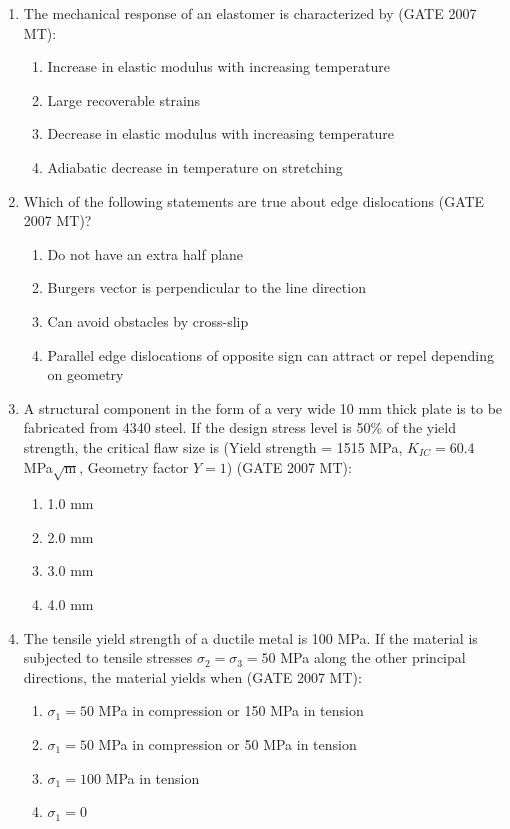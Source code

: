 \documentclass[12pt]{article}
\begin{document}
\begin{enumerate}
\item The mechanical response of an elastomer is characterized by (GATE 2007 MT):  
  \begin{enumerate}[label=(\Alph*)]
    \item Increase in elastic modulus with increasing temperature
    \item Large recoverable strains
    \item Decrease in elastic modulus with increasing temperature
    \item Adiabatic decrease in temperature on stretching
  \end{enumerate}

\item Which of the following statements are true about edge dislocations (GATE 2007 MT)?  
  \begin{enumerate}[label=(\Alph*)]
    \item Do not have an extra half plane
    \item Burgers vector is perpendicular to the line direction
    \item Can avoid obstacles by cross-slip
    \item Parallel edge dislocations of opposite sign can attract or repel depending on geometry
  \end{enumerate}

\item A structural component in the form of a very wide 10 mm thick plate is to be fabricated from 4340 steel. If the design stress level is 50\% of the yield strength, the critical flaw size is (Yield strength = 1515 MPa, $K_{IC}=60.4$ MPa$\sqrt{\text{m}}$, Geometry factor $Y=1$) (GATE 2007 MT):  
  \begin{enumerate}[label=(\Alph*)]
    \item 1.0 mm
    \item 2.0 mm
    \item 3.0 mm
    \item 4.0 mm
  \end{enumerate}

\item The tensile yield strength of a ductile metal is 100 MPa. If the material is subjected to tensile stresses $\sigma_2 = \sigma_3 = 50$ MPa along the other principal directions, the material yields when (GATE 2007 MT):  
  \begin{enumerate}[label=(\Alph*)]
    \item $\sigma_1 = 50$ MPa in compression or 150 MPa in tension
    \item $\sigma_1 = 50$ MPa in compression or 50 MPa in tension
    \item $\sigma_1 = 100$ MPa in tension
    \item $\sigma_1 = 0$
  \end{enumerate}


\end{enumerate}
\end{document}
